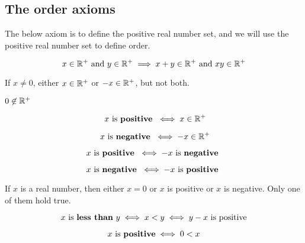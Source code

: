 \documentclass{report}
\begin{document}
\subsection{The order axioms}
The below axiom is to define the positive real number set, and we will use the positive real number set to define order.
\begin{axiom}
  \begin{equation}
  x\in\mathbb{R}^+ \text{ and }y\in\mathbb{R}^+\implies x+y\in\mathbb{R}^+ \text{ and } xy\in\mathbb{R}^+
  \end{equation}
\end{axiom}
\begin{axiom}
If $x\neq 0$, either $x\in\mathbb{R}^+$ or $-x\in\mathbb{R}^+$, but not both.
\end{axiom}
\begin{axiom}
$0\not\in\mathbb{R}^+$
\end{axiom}
\begin{definition}
  \begin{equation}
  \text{  $x$ is \textbf{positive} }\iff x\in\mathbb{R}^+
  \end{equation}
\end{definition}
\begin{definition}
\begin{equation}
\text{  $x$ is \textbf{negative} }\iff -x\in\mathbb{R}^+
\end{equation}
\end{definition}
\begin{theorem}
 \begin{equation}
 x\text{ is \textbf{positive} }\iff -x\text{ is \textbf{negative} }
 \end{equation}
\end{theorem}
\begin{corollary}
\begin{equation}
x\text{ is \textbf{negative} }\iff -x\text{ is \textbf{positive} }
\end{equation}
\end{corollary}
\begin{theorem}
 If $x$ is a real number, then either $x=0$ or $x$ is positive or $x$ is negative. Only one of them hold true.
\end{theorem}
\begin{definition}
  \begin{equation}
  \text{  $x$ is \textbf{less than}  $y$} \iff x<y\iff y-x \text{ is positive }
  \end{equation}
\end{definition}
\begin{theorem}
\begin{equation}
x\text{ is \textbf{positive}}\iff 0<x
\end{equation} 
\end{theorem}
\end{document}
